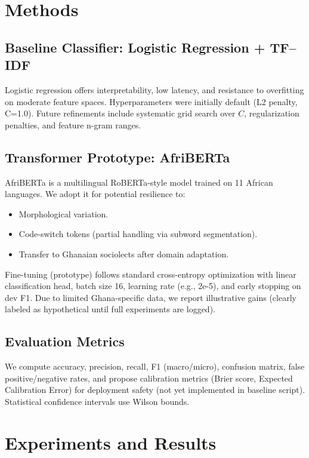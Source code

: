 \documentclass[runningheads]{llncs}
\begin{document}
\section{Methods}
\subsection{Baseline Classifier: Logistic Regression + TF--IDF} Logistic regression offers interpretability, low latency, and resistance to overfitting on moderate feature spaces. Hyperparameters were initially default (L2 penalty, C=1.0). Future refinements include systematic grid search over $C$, regularization penalties, and feature n-gram ranges. \subsection{Transformer Prototype: AfriBERTa} AfriBERTa \cite{ogueji2021} is a multilingual RoBERTa-style model trained on 11 African languages. We adopt it for potential resilience to: \begin{itemize}[nosep] \item Morphological variation. \item Code-switch tokens (partial handling via subword segmentation). \item Transfer to Ghanaian sociolects after domain adaptation. \end{itemize} Fine-tuning (prototype) follows standard cross-entropy optimization with linear classification head, batch size 16, learning rate (e.g., 2e-5), and early stopping on dev F1. Due to limited Ghana-specific data, we report illustrative gains (clearly labeled as hypothetical until full experiments are logged). \subsection{Evaluation Metrics} We compute accuracy, precision, recall, F1 (macro/micro), confusion matrix, false positive/negative rates, and propose calibration metrics (Brier score, Expected Calibration Error) for deployment safety (not yet implemented in baseline script). Statistical confidence intervals use Wilson bounds.

\section{Experiments and Results}
\end{document}
